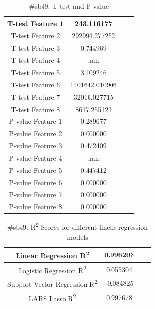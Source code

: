 \documentclass[12pt]{article}
\begin{document}
\begin{table}[H]
	\centering
	\begin{tabular}{| c | c | c | c |}
		\hline 
		T-test Feature 1 & 243.116177 \\\hline
		T-test Feature 2 & 292994.277252 \\\hline
		T-test Feature 3 & 0.744969 \\\hline 
		T-test Feature 4 & nan \\\hline
		T-test Feature 5 & 3.109246 \\\hline
		T-test Feature 6 & 1401642.010906 \\\hline
		T-test Feature 7 & 32016.027715 \\\hline
		T-test Feature 8 & 8617.255121 \\\hline
		P-value Feature 1 & 0.289677 \\\hline
		P-value Feature 2 & 0.000000 \\\hline
		P-value Feature 3 & 0.472409 \\\hline
		P-value Feature 4 & nan \\\hline
		P-value Feature 5 & 0.447412 \\\hline
		P-value Feature 6 & 0.000000 \\\hline
		P-value Feature 7 & 0.000000 \\\hline
		P-value Feature 8 & 0.000000 \\\hline
	\end{tabular} 
	\caption{\#sb49: T-test and P-value}
	\label{part1:tab1}
\end{table} 


\begin{table}[H]
	\centering
	\begin{tabular}{| c | c | c | c |}
		\hline 
		Linear Regression R\textsuperscript2  & 0.996203 \\\hline
		Logistic Regression R\textsuperscript2  & 0.055304 \\\hline
		Support Vector Regression R\textsuperscript2  & -0.084825 \\\hline
		LARS Lasso R\textsuperscript2  & 0.997678 \\\hline
	\end{tabular} 
	\caption{\#sb49: R\textsuperscript2 Scores for different linear regression models}
	\label{part1:tab1}
\end{table} 
\end{document}
